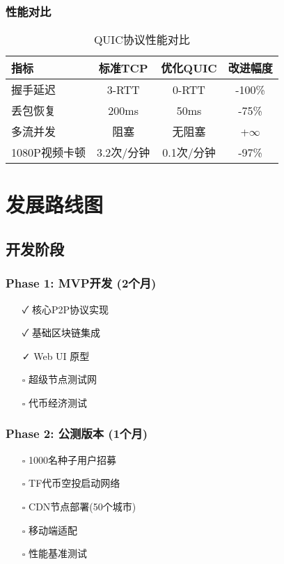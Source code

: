 \documentclass[12pt,a4paper]{article}
\begin{document}
\subsubsection{性能对比}

\begin{table}[h]
\centering
\begin{tabular}{|l|c|c|c|}
\hline
\textbf{指标} & \textbf{标准TCP} & \textbf{优化QUIC} & \textbf{改进幅度} \\
\hline
握手延迟 & 3-RTT & 0-RTT & -100\% \\
\hline
丢包恢复 & 200ms & 50ms & -75\% \\
\hline
多流并发 & 阻塞 & 无阻塞 & +$\infty$ \\
\hline
1080P视频卡顿 & 3.2次/分钟 & 0.1次/分钟 & -97\% \\
\hline
\end{tabular}
\caption{QUIC协议性能对比}
\end{table}

\section{发展路线图}

\subsection{开发阶段}

\subsubsection{Phase 1: MVP开发 (2个月)}
\begin{itemize}
    \item[✓] 核心P2P协议实现
    \item[✓] 基础区块链集成
    \item[✓] Web UI 原型
    \item[$\square$] 超级节点测试网
    \item[$\square$] 代币经济测试
\end{itemize}

\subsubsection{Phase 2: 公测版本 (1个月)}
\begin{itemize}
    \item[$\square$] 1000名种子用户招募
    \item[$\square$] TF代币空投启动网络
    \item[$\square$] CDN节点部署(50个城市)
    \item[$\square$] 移动端适配
    \item[$\square$] 性能基准测试
\end{itemize}
\end{document}
